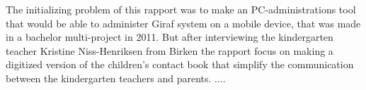 The initializing problem of this rapport was to make an PC-administrations tool that would be able to administer Giraf system on a mobile device, that was made in a bachelor multi-project in 2011. But after interviewing the kindergarten teacher Kristine Niss-Henriksen from Birken the rapport focus on making a  digitized version of the children's contact book that simplify the communication between the kindergarten teachers and parents. 
....